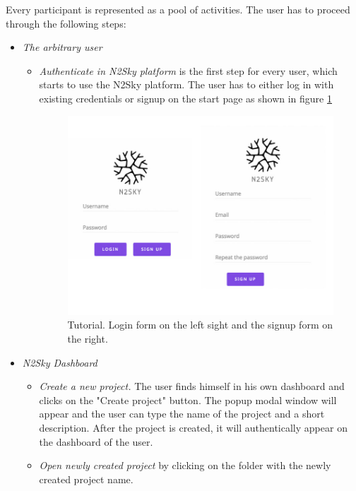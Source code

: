 Every participant is represented as a pool of activities. The user has to proceed through the following steps:

\begin{itemize}
\item \emph{The arbitrary user} 
\begin{itemize}
\item \emph{Authenticate in N2Sky platform} is the first step for every user, which starts to use the N2Sky platform. 
The user has to either log in with existing credentials or signup on the start page as shown in figure \ref{fig:sign_login}

\begin{figure}[H]
\begin{center}
  \includegraphics[width=\linewidth]{components/tutorial/img/sign_login.jpg}
  \caption{Tutorial. Login form on the left sight and the signup form on the right.}
  \label{fig:sign_login}
\end{center}
\end{figure} 
\end{itemize}
\item \emph{N2Sky Dashboard} 
\begin{itemize}
\item \emph{Create a new project.} The user finds himself in his own dashboard and clicks on the "Create project" button. The popup modal window will appear and the user can type the name of the project and a short description. After the project is created, it will authentically appear on the dashboard of the user.  
\item \emph{Open newly created project} by clicking on the folder with the newly created project name.

\end{itemize}
\end{itemize}
